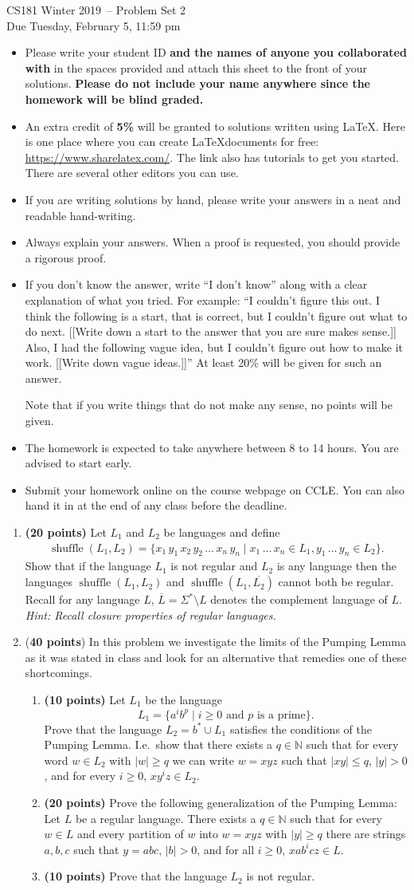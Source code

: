 \documentclass[letterpaper, 12pt]{article}
\theoremstyle{definition}
\numberwithin{equation}{section}
\DeclareMathOperator{\shuffle}{shuffle}
\newcommand{\N}{\mathbb N}
\newcommand{\abs}[1]{\left \vert #1 \right\vert}
\newcommand{\qtrinfo}{CS181 Winter 2019}
\newcommand{\headnote}{
\begin{itemize}
\item Please write your student ID \textbf{and the names of anyone you collaborated with} in the spaces provided and attach this sheet to the front of your solutions. \textbf{Please do not include your name anywhere since the homework will be blind graded.}
\item An extra credit of \textbf{5\%} will be granted to solutions written using \LaTeX. Here is one place where you can create \LaTeX documents for free: \url{https://www.sharelatex.com/}. The link also has tutorials to get you started. There are several other editors you can use.
\item If you are writing solutions by hand, please write your answers in a neat and readable hand-writing.
\item Always explain your answers. When a proof is requested, you should provide a rigorous proof.
\item If you don't know the answer, write ``I don't know'' along with a clear explanation of what you tried. For example: ``I couldn't figure this out. I think the following is a start, that is correct, but I couldn't figure out what to do next. [[Write down a start to the answer that you are sure makes sense.]] Also, I had the following vague idea, but I couldn't figure out how to make it work. [[Write down vague ideas.]]'' At least 20\% will be given for such an answer.

Note that if you write things that do not make any sense, no points will be given.
\item The homework is expected to take anywhere between 8 to 14 hours. You are
advised to start early.
\item Submit your homework online on the course webpage on CCLE. You can also hand it in at the end of any class before the deadline.
\end{itemize}
}
\newcommand{\hwhead}[2]{
	\raggedleft{Student ID: \underline{\hspace{3in}} \\ \medskip
              Collaborators: \underline{\hspace{3in}} \\ \medskip}
  \bigskip
  \begin{center}
  	{\LARGE{\qtrinfo \ -- Problem Set #1}}\\[0.3cm]
  	{\Large{Due #2}}
  \end{center}
  \bigskip
  \raggedright
  \headnote
}
\begin{document}
\hwhead{2}{Tuesday, February 5, 11:59 pm}


\begin{center}
\end{center}


\newpage
\begin{enumerate}

\item{\bf (20 points)} Let $L_1$ and $L_2$ be languages and define
	\begin{align*}
		\shuffle(L_1, L_2) = \{x_1\, y_1\, x_2\, y_2\,\dots\, x_n\, y_n\mid x_1\, \dots\, x_n\in L_1, y_1\,\dots\, y_n\in L_2\}.
	\end{align*}
 Show that if the language $L_1$ is not regular and $L_2$ is any language then the languages $\shuffle(L_1, L_2)$ and $\shuffle(L_1, \overline{L_2})$ cannot both be regular.	 Recall for any language  $L$, $\overline{L}= \Sigma^{*}\setminus L$ denotes the complement language of $L$.\\
\emph{Hint: Recall closure properties of regular languages.}

 \item (\textbf{40 points}) In this problem we investigate the limits of the Pumping Lemma as it was stated in class and look for an alternative that remedies one of these shortcomings.
 	\begin{enumerate}
 		\item {\bf (10 points)} Let $L_1$ be the language
		$$L_1 = \{a^ib^{p} \mid \text{$i\geq 0$ and $p$ is a prime}\}.$$
		Prove that the language $L_2 = b^* \cup L_1 $ satisfies the conditions of the Pumping Lemma.
	I.e.\ show that there exists a $q\in \N$ such that for every word $w\in L_2$ with $\abs{w}\geq q$ we can write $w=xyz$ such that $\abs{xy}\leq q$, $\abs y>0$, and for every $i\geq 0$, $xy^iz \in L_2$.
		\item {\bf (20 points)} Prove the following generalization of the Pumping Lemma:\\ Let $L$ be a regular language. There exists a $q\in \N$ such that for every $w\in L$ and every partition of $w$ into $w=xyz$ with $\abs y\geq q$ there are strings $a, b, c$ such that $y=abc$, $\abs b>0$, and for all $i\geq 0$, $xab^icz\in L$.
		\item {\bf (10 points)} Prove that the language $L_2$ is not regular.
	\end{enumerate}









\end{enumerate}
\end{document}
